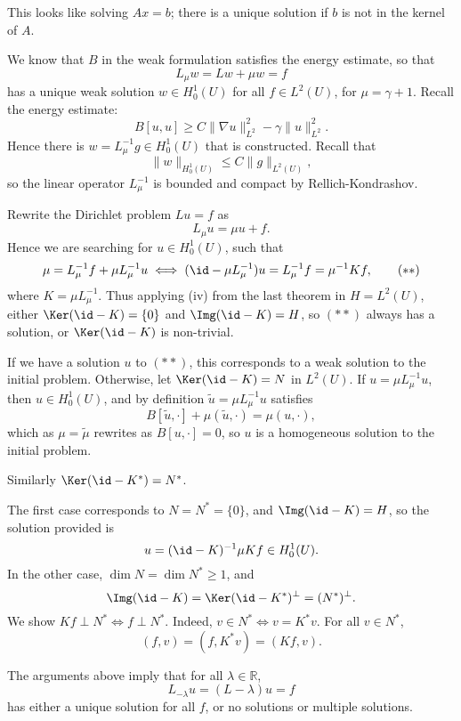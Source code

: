 \documentclass[12pt]{article}
\begin{document}
\begin{remark}
	This looks like solving $Ax = b$; there is a unique solution if $b$ is not in the kernel of $A$.
\end{remark}

\begin{proofbox}
	We know that $B$ in the weak formulation satisfies the energy estimate, so that
	\[
	L_\mu w = Lw + \mu w = f
	\]
	has a unique weak solution $w \in H_0^1(U)$ for all $f \in L^2(U)$, for $\mu = \gamma + 1$. Recall the energy estimate:
	\[
		B[u, u] \geq C \|\nabla u\|^2_{L^2} - \gamma \|u\|^2_{L^2}.
	\]
	Hence there is $w = L_\mu^{-1} g \in H^1_0(U)$ that is constructed. Recall that
	\[
	\|w\|_{H^1_0(U)} \leq C \|g\|_{L^2(U)},
	\]
	so the linear operator $L_\mu^{-1}$ is bounded and compact by Rellich-Kondrashov.

	Rewrite the Dirichlet problem $Lu = f$ as
	\[
	L_\mu u = \mu u + f.
	\]
	Hence we are searching for $u \in H^1_0(U)$, such that
	\[
		\mu = L_\mu^{-1} f + \mu L_\mu^{-1} u \iff (\id - \mu L_{\mu}^{-1})u = L_\mu^{-1} f = \mu^{-1} K f, \tag{$\ast\ast$}
	\]
	where $K = \mu L_{\mu}^{-1}$. Thus applying (iv) from the last theorem in $H = L^2(U)$, either $\Ker (\id - K) = \{0\}$ and $\Img (\id - K) = H$, so $(\ast\ast)$ always has a solution, or $\Ker (\id - K)$ is non-trivial.

	If we have a solution $u$ to $(\ast\ast)$, this corresponds to a weak solution to the initial problem. Otherwise, let $\Ker(\id - K) = N$ in $L^2(U)$. If $u = \mu L_\mu^{-1} u$, then $u \in H^1_0(U)$, and by definition $\tilde u = \mu L_{\mu}^{-1}u$ satisfies
	\[
		B[\tilde u, \cdot] + \mu (\tilde u, \cdot) = \mu (u, \cdot),
	\]
	which as $\mu = \tilde \mu$ rewrites as $B[u, \cdot] = 0$, so $u$ is a homogeneous solution to the initial problem.

	Similarly $\Ker(\id - K^{\ast}) = N^{\ast}$.

	The first case corresponds to $N = N^{\ast} = \{0\}$, and $\Img (\id - K) = H$, so the solution provided is
	\[
	u = (\id - K)^{-1} \mu K f \in H^1_0(U).
	\]
	In the other case, $\dim N = \dim N^{\ast} \geq 1$, and
	\[
	\Img (\id - K) = \Ker (\id - K^{\ast})^{\perp} = (N^{\ast})^{\perp}.
	\]
	We show $Kf \perp N^{\ast} \iff f \perp N^{\ast}$.
	Indeed, $v \in N^{\ast} \iff v = K^{\ast} v$. For all $v \in N^{\ast}$,
	\[
		(f, v) = (f, K^{\ast} v) = (Kf, v).
	\]
\end{proofbox}

\begin{remark}
	The arguments above imply that for all $\lambda \in \mathbb{R}$,
	\[
	L_{-\lambda}u = (L - \lambda)u = f
	\]
	has either a unique solution for all $f$, or no solutions or multiple solutions.
\end{remark}
\end{document}
